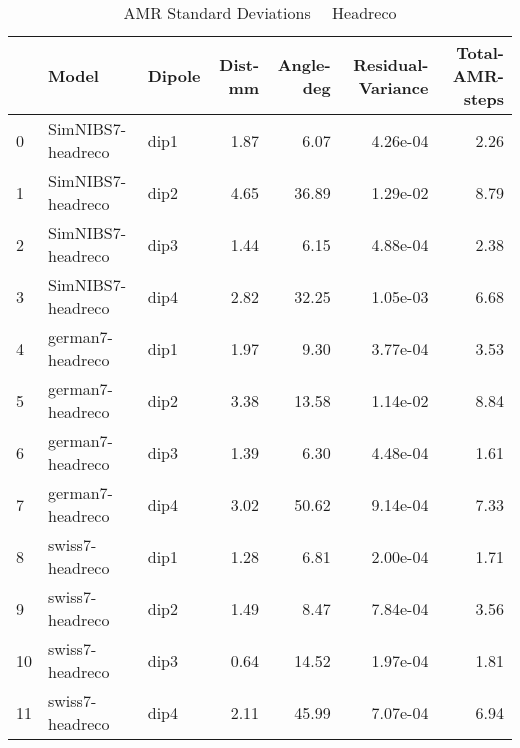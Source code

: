 \documentclass{article}
\begin{document}
\begin{table}
\begin{tabular}{lllrrrr}
\toprule
& Model& Dipole& Dist-mm& Angle-deg& Residual-Variance& Total-AMR-steps\\
\midrule
\rowcolor{lightgray}0 & SimNIBS7-headreco & dip1 & 1.87 & 6.07 & 4.26e-04 & 2.26\\
\rowcolor{lightgray}1 & SimNIBS7-headreco & dip2 & 4.65 & 36.89 & 1.29e-02 & 8.79\\
\rowcolor{lightgray}2 & SimNIBS7-headreco & dip3 & 1.44 & 6.15 & 4.88e-04 & 2.38\\
\rowcolor{lightgray}3 & SimNIBS7-headreco & dip4 & 2.82 & 32.25 & 1.05e-03 & 6.68\\
\rowcolor{yellow}4 & german7-headreco & dip1 & 1.97 & 9.30 & 3.77e-04 & 3.53\\
\rowcolor{yellow}5 & german7-headreco & dip2 & 3.38 & 13.58 & 1.14e-02 & 8.84\\
\rowcolor{yellow}6 & german7-headreco & dip3 & 1.39 & 6.30 & 4.48e-04 & 1.61\\
\rowcolor{yellow}7 & german7-headreco & dip4 & 3.02 & 50.62 & 9.14e-04 & 7.33\\
\rowcolor{pink}8 & swiss7-headreco & dip1 & 1.28 & 6.81 & 2.00e-04 & 1.71\\
\rowcolor{pink}9 & swiss7-headreco & dip2 & 1.49 & 8.47 & 7.84e-04 & 3.56\\
\rowcolor{pink}10 & swiss7-headreco & dip3 & 0.64 & 14.52 & 1.97e-04 & 1.81\\
\rowcolor{pink}11 & swiss7-headreco & dip4 & 2.11 & 45.99 & 7.07e-04 & 6.94\\
\end{tabular}
\caption{AMR Standard Deviations \ \textemdash \ Headreco}
\end{table}
\end{document}
